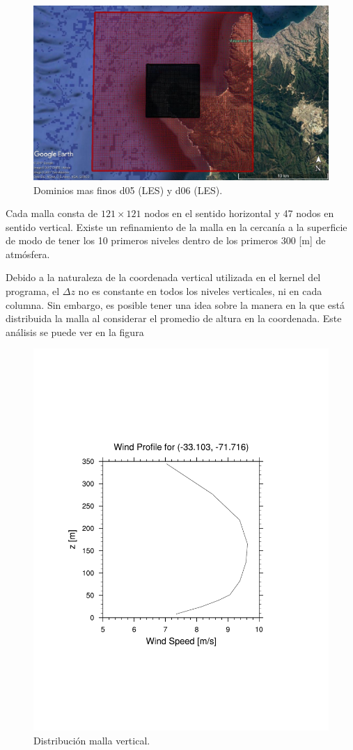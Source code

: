\begin{figure}[H]
	\centering
	\includegraphics[width=0.95\linewidth]{Imagenes/d02d01}
	\caption{Dominios mas finos d05 (LES) y d06 (LES).}
	\label{fig:0506}
\end{figure}
Cada malla consta de $121\times 121$ nodos en el sentido horizontal y 47 nodos en sentido vertical. Existe un refinamiento de la malla en la cercanía a la superficie de modo de tener los 10 primeros niveles dentro de los primeros 300 [m] de atmósfera.

Debido a la naturaleza de la coordenada vertical utilizada en el kernel del programa, el $\Delta z$ no es constante en todos los niveles verticales, ni en cada columna. Sin embargo, es posible tener una idea sobre la manera en la que está distribuida la malla al considerar el promedio de altura en la coordenada. Este análisis se puede ver en la figura

\begin{figure}[H]
	\centering
	\includegraphics[width=0.8\linewidth,page=9,trim={1cm 6cm 1cm 7.85cm},clip]{Imagenes/perfil_medio}
	\caption{Distribución malla vertical.}
	\label{fig:vertical_mesh}
\end{figure}

